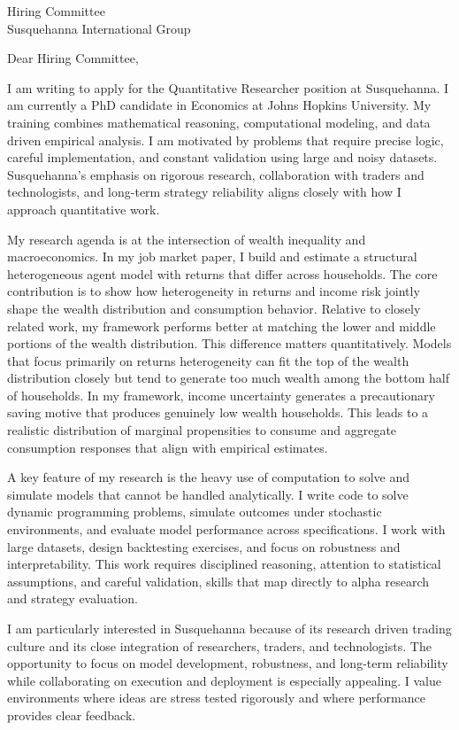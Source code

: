 \documentclass[11pt]{letter}
\begin{document}
\begin{letter}{Hiring Committee \\ Susquehanna International Group}

\opening{Dear Hiring Committee,}

I am writing to apply for the Quantitative Researcher position at Susquehanna. I am currently a PhD candidate in Economics at Johns Hopkins University. My training combines mathematical reasoning, computational modeling, and data driven empirical analysis. I am motivated by problems that require precise logic, careful implementation, and constant validation using large and noisy datasets. Susquehanna’s emphasis on rigorous research, collaboration with traders and technologists, and long-term strategy reliability aligns closely with how I approach quantitative work.

My research agenda is at the intersection of wealth inequality and macroeconomics. In my job market paper, I build and estimate a structural heterogeneous agent model with returns that differ across households. The core contribution is to show how heterogeneity in returns and income risk jointly shape the wealth distribution and consumption behavior. Relative to closely related work, my framework performs better at matching the lower and middle portions of the wealth distribution. This difference matters quantitatively. Models that focus primarily on returns heterogeneity can fit the top of the wealth distribution closely but tend to generate too much wealth among the bottom half of households. In my framework, income uncertainty generates a precautionary saving motive that produces genuinely low wealth households. This leads to a realistic distribution of marginal propensities to consume and aggregate consumption responses that align with empirical estimates.

A key feature of my research is the heavy use of computation to solve and simulate models that cannot be handled analytically. I write code to solve dynamic programming problems, simulate outcomes under stochastic environments, and evaluate model performance across specifications. I work with large datasets, design backtesting exercises, and focus on robustness and interpretability. This work requires disciplined reasoning, attention to statistical assumptions, and careful validation, skills that map directly to alpha research and strategy evaluation.

I am particularly interested in Susquehanna because of its research driven trading culture and its close integration of researchers, traders, and technologists. The opportunity to focus on model development, robustness, and long-term reliability while collaborating on execution and deployment is especially appealing. I value environments where ideas are stress tested rigorously and where performance provides clear feedback.


\end{letter}
\end{document}
